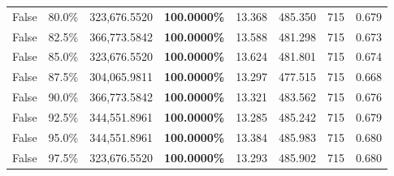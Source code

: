 \begin{table}[H]
\begin{tabular}{lllrllll}
\cline{1-8}
False & 80.0\% & 323,676.5520 & \bfseries \color{red} 100.0000\% & 13.368 & 485.350 & 715 & 0.679 \\
\cline{1-8}
False & 82.5\% & 366,773.5842 & \bfseries \color{red} 100.0000\% & 13.588 & 481.298 & 715 & 0.673 \\
\cline{1-8}
False & 85.0\% & 323,676.5520 & \bfseries \color{red} 100.0000\% & 13.624 & 481.801 & 715 & 0.674 \\
\cline{1-8}
False & 87.5\% & \color{red} 304,065.9811 & \bfseries \color{red} 100.0000\% & 13.297 & 477.515 & 715 & 0.668 \\
\cline{1-8}
False & 90.0\% & 366,773.5842 & \bfseries \color{red} 100.0000\% & 13.321 & 483.562 & 715 & 0.676 \\
\cline{1-8}
False & 92.5\% & 344,551.8961 & \bfseries \color{red} 100.0000\% & 13.285 & 485.242 & 715 & 0.679 \\
\cline{1-8}
False & 95.0\% & 344,551.8961 & \bfseries \color{red} 100.0000\% & 13.384 & 485.983 & 715 & 0.680 \\
\cline{1-8}
False & 97.5\% & 323,676.5520 & \bfseries \color{red} 100.0000\% & 13.293 & 485.902 & 715 & 0.680 \\
\cline{1-8}
\bottomrule
\end{tabular}
\end{table}
